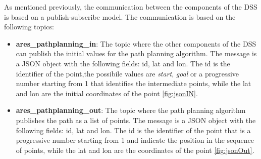 \documentclass[journal,article,submit,pdftex,moreauthors]{Definitions/mdpi}
\begin{document}
As mentioned previously, the communication between the components of the DSS is based on a publish-subscribe model. The communication is based on the following topics:


\begin{itemize}
	\item \textbf{ares\_pathplanning\_in}: The topic where the other components of the DSS can publish the initial values for the path planning algorithm. The message is a JSON object with the following fields: id, lat and lon. The id is the identifier of
	the point,the possibile values are \textit{start}, \textit{goal} or a progressive number starting from 1 that identifies the intermediate points, while the lat and lon are the initial coordinates of the point \ref*{fig:jsonIN}.
	\item \textbf{ares\_pathplanning\_out}: The topic where the path planning algorithm publishes the path as a list of points. The message is a JSON object with the following fields: id, lat and lon. The id is the identifier of the point that is a progressive number starting from 1 and indicate the position in the sequence of points, while the lat and lon are the coordinates of the point \ref{fig:jsonOut}.
\end{itemize}

\end{document}
